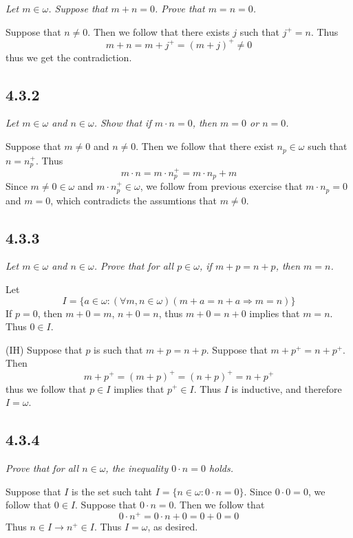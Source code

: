 \documentclass[11pt,oneside,titlepage]{book}
\DeclareMathOperator \ra {\Rightarrow}
\begin{document}
\textit{Let $m \in \omega$. Suppose that $m + n = 0$. Prove that $m = n = 0$.}

Suppose that $n \neq 0$. Then we follow that there exists $j$ such that $j^+ = n$. Thus
$$m + n = m + j^+ = (m + j)^+ \neq 0$$
thus we get the contradiction.

\subsection*{4.3.2}

\textit{Let $m \in \omega$ and $n \in \omega$. Show that if $m \cdot n = 0$, then $m = 0$ or
  $n = 0$.}

Suppose that $m \neq 0$ and $n \neq 0$. Then we follow that there exist $n_p \in \omega$
such that $n = n_p^+$. Thus
$$m \cdot n = m \cdot n_p^+ = m \cdot n_p +  m$$
Since $m \neq 0 \in \omega$ and $m \cdot n_p^+ \in \omega$, we follow from previous exercise
that $m \cdot n_p = 0$ and $m = 0$, which contradicts the assumtions that $m \neq 0$.

\subsection*{4.3.3}

\textit{Let $m \in \omega$ and $n \in \omega$. Prove that for all $p \in \omega$, if
  $m + p = n + p$, then $m = n$.}

Let
$$I = \{a \in \omega: (\forall m, n \in \omega)(m + a = n + a \ra m = n)\}$$
If $p = 0$, then $m + 0 = m$, $n + 0 = n$, thus $m + 0 = n + 0$ implies that $m = n$.
Thus $0 \in I$.

(IH) Suppose that $p$ is such that $m + p = n + p$. Suppose that $m + p^+ = n + p^+$. Then
$$m + p^+ = (m + p)^+ = (n + p)^+ = n + p^+$$
thus we follow that $p \in I$ implies that  $p^+ \in I$. Thus $I$ is inductive, and therefore
$I = \omega$.

\subsection*{4.3.4}

\textit{Prove that for all $n \in \omega$, the inequality $0 \cdot n = 0$ holds.}

Suppose that $I$ is the set such taht
$I = \{n \in \omega: 0 \cdot n = 0\}$.
Since $0 \cdot 0 = 0$, we follow that $0 \in I$. Suppose that $0 \cdot n = 0$. Then we follow that
$$0 \cdot n^+ = 0 \cdot n + 0 = 0 + 0 = 0$$
Thus $n \in I \to n^+ \in I$. Thus $I = \omega$, as desired.
\end{document}
